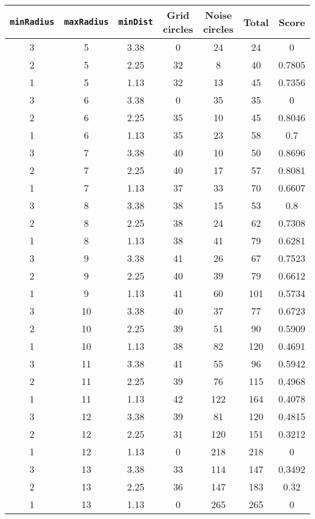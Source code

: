 \documentclass[letterpaper, 12pt]{article}
\begin{document}
\begin{longtable}{|c|c|c|c|c|c|c|}
\hline
\textbf{\texttt{minRadius}} & \textbf{\texttt{maxRadius}} & \textbf{\texttt{minDist}} & \textbf{Grid circles} & \textbf{Noise circles} & \textbf{Total} & \textbf{Score} \\
\hline
3 & 5 & 3.38 & 0 & 24 & 24 & 0 \\
\hline
2 & 5 & 2.25 & 32 & 8 & 40 & 0.7805 \\
\hline
1 & 5 & 1.13 & 32 & 13 & 45 & 0.7356 \\
\hline
3 & 6 & 3.38 & 0 & 35 & 35 & 0 \\
\hline
2 & 6 & 2.25 & 35 & 10 & 45 & 0.8046 \\
\hline
1 & 6 & 1.13 & 35 & 23 & 58 & 0.7 \\
\hline
3 & 7 & 3.38 & 40 & 10 & 50 & 0.8696 \\
\hline
2 & 7 & 2.25 & 40 & 17 & 57 & 0.8081 \\
\hline
1 & 7 & 1.13 & 37 & 33 & 70 & 0.6607 \\
\hline
3 & 8 & 3.38 & 38 & 15 & 53 & 0.8 \\
\hline
2 & 8 & 2.25 & 38 & 24 & 62 & 0.7308 \\
\hline
1 & 8 & 1.13 & 38 & 41 & 79 & 0.6281 \\
\hline
3 & 9 & 3.38 & 41 & 26 & 67 & 0.7523 \\
\hline
2 & 9 & 2.25 & 40 & 39 & 79 & 0.6612 \\
\hline
1 & 9 & 1.13 & 41 & 60 & 101 & 0.5734 \\
\hline
3 & 10 & 3.38 & 40 & 37 & 77 & 0.6723 \\
\hline
2 & 10 & 2.25 & 39 & 51 & 90 & 0.5909 \\
\hline
1 & 10 & 1.13 & 38 & 82 & 120 & 0.4691 \\
\hline
3 & 11 & 3.38 & 41 & 55 & 96 & 0.5942 \\
\hline
2 & 11 & 2.25 & 39 & 76 & 115 & 0.4968 \\
\hline
1 & 11 & 1.13 & 42 & 122 & 164 & 0.4078 \\
\hline
3 & 12 & 3.38 & 39 & 81 & 120 & 0.4815 \\
\hline
2 & 12 & 2.25 & 31 & 120 & 151 & 0.3212 \\
\hline
1 & 12 & 1.13 & 0 & 218 & 218 & 0 \\
\hline
3 & 13 & 3.38 & 33 & 114 & 147 & 0.3492 \\
\hline
2 & 13 & 2.25 & 36 & 147 & 183 & 0.32 \\
\hline
1 & 13 & 1.13 & 0 & 265 & 265 & 0 \\

\end{longtable}
\end{document}
